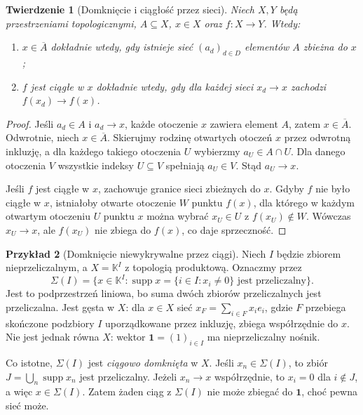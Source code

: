 \documentclass[11pt,a4paper]{article}
\numberwithin{equation}{section}
\theoremstyle{plain}
\newtheorem{twierdzenie}{Twierdzenie}[section]
\theoremstyle{definition}
\newtheorem{przyklad}[twierdzenie]{Przykład}
\theoremstyle{remark}
\newcommand{\K}{\mathbb K}
\DeclareMathOperator{\supp}{supp}
\begin{document}
\begin{twierdzenie}[Domknięcie i ciągłość przez sieci]\label{thm:nets-topology}
Niech $X,Y$ będą przestrzeniami topologicznymi, $A\subseteq X$,
$x\in X$ oraz $f:X\to Y$. Wtedy:
\begin{enumerate}[label=\textup{(\roman*)}]
\item $x\in\overline A$ dokładnie wtedy, gdy istnieje sieć
      $(a_d)_{d\in D}$ elementów $A$ zbieżna do $x$;
\item $f$ jest ciągłe w $x$ dokładnie wtedy, gdy dla każdej sieci
      $x_d\to x$ zachodzi $f(x_d)\to f(x)$.
\end{enumerate}
\end{twierdzenie}
\begin{proof}
Jeśli $a_d\in A$ i $a_d\to x$, każde otoczenie $x$ zawiera element $A$,
zatem $x\in\overline A$. Odwrotnie, niech $x\in\overline A$.
Skierujmy rodzinę otwartych otoczeń $x$ przez odwrotną inkluzję,
a dla każdego takiego otoczenia $U$ wybierzmy $a_U\in A\cap U$.
Dla danego otoczenia $V$ wszystkie indeksy $U\subseteq V$
spełniają $a_U\in V$. Stąd $a_U\to x$.

Jeśli $f$ jest ciągłe w $x$, zachowuje granice sieci zbieżnych do $x$.
Gdyby $f$ nie było ciągłe w $x$, istniałoby otwarte otoczenie $W$
punktu $f(x)$, dla którego w każdym otwartym otoczeniu $U$ punktu $x$
można wybrać $x_U\in U$ z $f(x_U)\notin W$. Wówczas $x_U\to x$,
ale $f(x_U)$ nie zbiega do $f(x)$, co daje sprzeczność.
\end{proof}

\begin{przyklad}[Domknięcie niewykrywalne przez ciągi]\label{ex:sigma-net}
Niech $I$ będzie zbiorem nieprzeliczalnym, a
$X=\K^I$ z topologią produktową. Oznaczmy przez
\[
 \Sigma(I)=\{x\in\K^I:\supp x=\{i\in I:x_i\ne0\}
                 \text{ jest przeliczalny}\}.
\]
Jest to podprzestrzeń liniowa, bo suma dwóch zbiorów przeliczalnych
jest przeliczalna. Jest gęsta w $X$: dla $x\in X$ sieć
$x_F=\sum_{i\in F}x_i e_i$, gdzie $F$ przebiega skończone podzbiory
$I$ uporządkowane przez inkluzję, zbiega współrzędnie do $x$.
Nie jest jednak równa $X$: wektor $\mathbf1=(1)_{i\in I}$
ma nieprzeliczalny nośnik.

Co istotne, $\Sigma(I)$ jest \emph{ciągowo domknięta} w $X$.
Jeśli $x_n\in\Sigma(I)$, to zbiór $J=\bigcup_n\supp x_n$
jest przeliczalny. Jeżeli $x_n\to x$ współrzędnie, to $x_i=0$
dla $i\notin J$, a więc $x\in\Sigma(I)$. Zatem żaden ciąg
z $\Sigma(I)$ nie może zbiegać do $\mathbf1$, choć pewna sieć może.
\end{przyklad}
\end{document}
